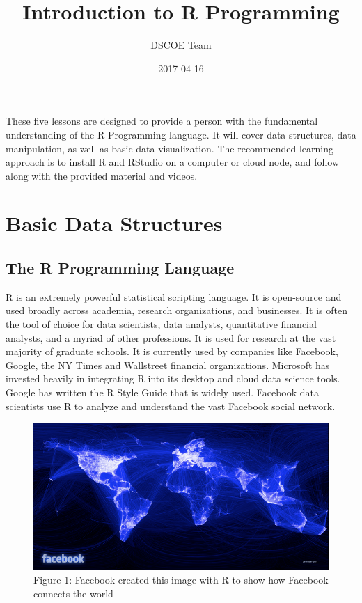 \documentclass[]{book}
\title{Introduction to R Programming}
\author{DSCOE Team}
\date{2017-04-16}
\begin{document}
\maketitle

{
\setcounter{tocdepth}{1}
\tableofcontents
}
These five lessons are designed to provide a person with the fundamental
understanding of the R Programming language. It will cover data
structures, data manipulation, as well as basic data visualization. The
recommended learning approach is to install R and RStudio on a computer
or cloud node, and follow along with the provided material and videos.

\chapter{Basic Data Structures}\label{basic-data-structures}

\section{The R Programming Language}\label{the-r-programming-language}

R is an extremely powerful statistical scripting language. It is
open-source and used broadly across academia, research organizations,
and businesses. It is often the tool of choice for data scientists, data
analysts, quantitative financial analysts, and a myriad of other
professions. It is used for research at the vast majority of graduate
schools. It is currently used by companies like Facebook, Google, the NY
Times and Wallstreet financial organizations. Microsoft has invested
heavily in integrating R into its desktop and cloud data science tools.
Google has written the R Style Guide that is widely used. Facebook data
scientists use R to analyze and understand the vast Facebook social
network.

\begin{figure}[htbp]
\centering
\includegraphics{facebook.png}
\caption{Figure 1: Facebook created this image with R to show how
Facebook connects the world}
\end{figure}
\end{document}
